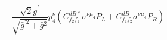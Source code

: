 %
\begin{dmath*}
%
  -  \frac{\sqrt{2} {\bar g}^\prime}{\sqrt{{\bar g}^{\prime 2} + {\bar g}{}^2}} p_4^{\nu} \left(C^{dB*}_{f_2 f_1} \sigma^{\nu  \mu_4} P_L  + C^{dB}_{f_1 f_2} \sigma^{\nu  \mu_4} P_R \right)
%
\end{dmath*}
%
